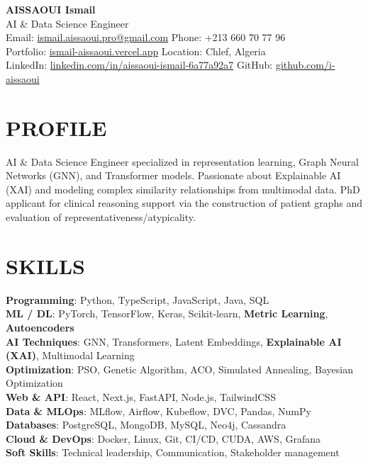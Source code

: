 \documentclass[a4paper,12pt]{article}
\begin{document}
\begin{center}
    {\Huge\bfseries\color{titleblue} AISSAOUI Ismail}\\[4pt]
    {\Large AI \& Data Science Engineer}\\[6pt]

    {\normalsize
    Email: \href{mailto:ismail.aissaoui.pro@gmail.com}{ismail.aissaoui.pro@gmail.com} \quad
    Phone: +213 660 70 77 96 \\
    Portfolio: \href{https://ismail-aissaoui.vercel.app}{ismail-aissaoui.vercel.app} \quad
    Location: Chlef, Algeria \\
    LinkedIn: \href{https://linkedin.com/in/aissaoui-ismail-6a77a92a7}{linkedin.com/in/aissaoui-ismail-6a77a92a7} \quad
    GitHub: \href{https://github.com/i-aissaoui}{github.com/i-aissaoui}
    }
\end{center}

\section{PROFILE}
AI \& Data Science Engineer specialized in representation learning, Graph Neural Networks (GNN), and Transformer models. Passionate about Explainable AI (XAI) and modeling complex similarity relationships from multimodal data. PhD applicant for clinical reasoning support via the construction of patient graphs and evaluation of representativeness/atypicality.

\section{SKILLS}
\setlength{\parskip}{-1pt}
{\normalsize
\textbf{Programming}: Python, TypeScript, JavaScript, Java, SQL \\

\textbf{ML / DL}: PyTorch, TensorFlow, Keras, Scikit-learn, \textbf{Metric Learning}, \textbf{Autoencoders} \\

\textbf{AI Techniques}: GNN, Transformers, Latent Embeddings, \textbf{Explainable AI (XAI)}, Multimodal Learning \\

\textbf{Optimization}: PSO, Genetic Algorithm, ACO, Simulated Annealing, Bayesian Optimization \\

\textbf{Web \& API}: React, Next.js, FastAPI, Node.js, TailwindCSS \\

\textbf{Data \& MLOps}: MLflow, Airflow, Kubeflow, DVC, Pandas, NumPy \\

\textbf{Databases}: PostgreSQL, MongoDB, MySQL, Neo4j, Cassandra \\

\textbf{Cloud \& DevOps}: Docker, Linux, Git, CI/CD, CUDA, AWS, Grafana \\

\textbf{Soft Skills}: Technical leadership, Communication, Stakeholder management
}
\end{document}
